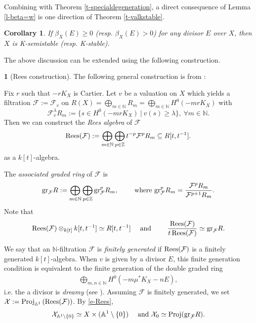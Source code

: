 \documentclass[12pt,reqno]{amsart}%
\newcommand{\Z}{{\mathbb{Z} }}
\newcommand{\bN}{{\mathbb{N} }}
\newcommand{\cX}{{\mathcal{X}}}
\newcommand{\cF}{\mathcal{F}}
\newcommand{\gr}{{\rm gr}}
\newtheorem{cor}[thm]{Corollary}
\theoremstyle{definition}
\newtheorem{say}[thm]{}
\theoremstyle{remark}
\newcommand{\Proj}{{\rm Proj}}
\newcommand{\N}{{\mathbb{N}}}
\newcommand{\la}{\lambda}
\begin{document}
Combining with Theorem \ref{t-specialdegeneration}, a direct consequence of Lemma \ref{l-beta=w} is one direction of Theorem \ref{t-valkstable}.  
\begin{cor}\label{c-kimpliesbeta}
If $\beta_{X}(E)\ge 0$ (resp. $\beta_{X}(E) >0$) for any divisor $E$ over $X$, then $X$ is K-semistable (resp. K-stable). 
\end{cor}


The above discussion can be extended using the following construction.

\begin{say}[Rees construction]\label{s-rees}
The following general construction is from \cite[\S 2]{BHJ17}:

Fix $r$ such that $-rK_X$ is Cartier. Let $v$ be a valuation on $X$ which yields a filtration $\cF:=\cF_v$ on $R(X)=\bigoplus_{m\in \bN}R_m=\bigoplus_{m\in \bN} H^0(-mrK_X)$ with 
\begin{equation}\label{e-VtoF}
\cF^{\la}_vR_m:=\{s\in H^0(-mrK_X) \ |\ v(s)\ge \la\}, \ \forall m\in \bN.
\end{equation}
Then we can construct the \emph{Rees algebra}  of $\cF$ 
\[
{\rm Rees}(\cF): = \bigoplus_{m \in \N}  \bigoplus_{p \in \Z} t^{-p} \cF^p R_m  \subseteq R[t,t^{-1}].\]
as a $k[t]$-algebra.

The \emph{associated graded ring} of $\cF$ is
\[
\gr_{\cF} R : =  \bigoplus_{m \in \N} \bigoplus_{p \in \Z} \gr_{\cF}^p R_m,
\quad\quad \text{ where } \gr_{\cF}^p R_m = \frac{\cF^{p}R_m}{\cF^{p+1}R_m}
.\]
Note that 
\begin{equation}\label{e-Rees}
{ \rm Rees}(\cF) \otimes_{k[t]} k[t,t^{-1}] \simeq R[t,t^{-1}] \quad 
\text{ and } 
\quad\quad
\frac{{\rm Rees}(\cF)}{ t\, {\rm Rees}(\cF)}  \simeq \gr_{\cF}R .\end{equation}

We say that an $\N$-filtration $\cF$ is \emph{finitely generated} if ${\rm Rees}(\cF)$ is a finitely generated $k[t]$-algebra.
 When $v$ is given by a divisor $E$, this finite generation condition is equivalent to the finite generation of
  the double graded ring
\begin{eqnarray}\label{e-doublegraded}
\bigoplus_{m,n\in \bN}H^0(-m\mu^*K_X-nE),
\end{eqnarray}
i.e. the a divisor is {\it dreamy} (see \cite[Definition 1.2(2)]{Fuj19c}). 
Assuming $\cF$ is finitely generated, we set  $\cX: = \Proj_{\mathbb{A}^1} \left({\rm Rees}(\cF)\right)$. 
By \eqref{e-Rees},
\[
\cX_{ \mathbb{A}^1\setminus \{0 \}} \simeq X \times ( \mathbb{A}^1\setminus \{0 \} ) 
\quad \text{ and }
\cX_0 \simeq \Proj ( \gr_{\cF} R ). 
\]
\end{say}
\end{document}
